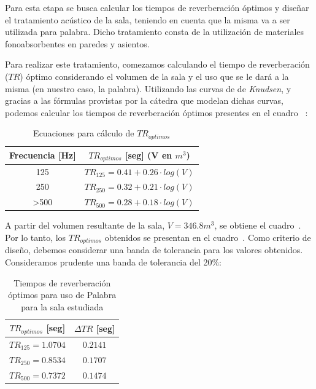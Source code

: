 \par Para esta etapa se busca calcular los tiempos de reverberación óptimos y diseñar el tratamiento acústico de la sala, teniendo en cuenta que la misma va a ser utilizada para palabra. Dicho tratamiento consta de la utilización de materiales fonoabsorbentes en paredes y asientos.\\

\par Para realizar este tratamiento, comezamos calculando el tiempo de reverberación ($TR$) óptimo considerando el volumen de la sala y el uso que se le dará a la misma (en nuestro caso, la palabra). Utilizando las curvas de  de \textit{Knudsen}, y gracias a las fórmulas provistas por la cátedra que modelan dichas curvas, podemos calcular los tiempos de reverberación óptimos presentes en el cuadro~ :

\begin{table}[h]
    \centering
    \begin{tabular}{|c|c|} \hline
        \textbf{Frecuencia [Hz]}  & \textbf{$TR_{optimos}$ [seg]} (V en $m^3$) \\ \hline
        125 & $TR_{125} = 0.41 + 0.26 \cdot log(V)$ \\ \hline
        250 & $TR_{250} = 0.32 + 0.21 \cdot log(V)$ \\ \hline
        >500 & $TR_{500} = 0.28 + 0.18 \cdot log(V)$ \\ \hline
    \end{tabular}
    \caption{Ecuaciones para cálculo de $TR_{optimos}$}
    \label{tab:ecuaciones_caluclo_TRoptimo}
\end{table}

\par A partir del volumen resultante de la sala, $V = 346.8 m^3$, se obtiene el cuadro~. Por lo tanto, los $TR_{optimos}$ obtenidos se presentan en el cuadro~. Como criterio de diseño, debemos considerar una banda de tolerancia para los valores obtenidos. Consideramos prudente una banda de tolerancia del 20\%:

\begin{table}[h]
    \centering
    \begin{tabular}{|c|c|} \hline
         $TR_{optimos}$ [seg] & $\Delta TR$ [seg] \\ \hline 
         $TR_{125} = 1.0704$  & $0.2141$ \\ \hline
         $TR_{250} = 0.8534$  & $0.1707$\\ \hline
         $TR_{500} = 0.7372$  & $0.1474$ \\ \hline
    \end{tabular}
    \caption{Tiempos de reverberación óptimos para uso de Palabra para la sala estudiada}
    \label{tab:TRoptimos_de_sala}
\end{table}

